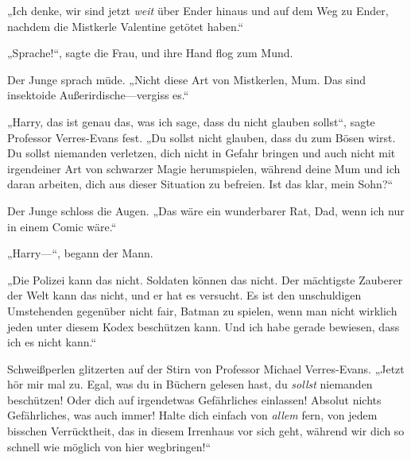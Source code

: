 „Ich denke, wir sind jetzt \emph{weit} über Ender hinaus und auf dem Weg zu Ender, nachdem die Mistkerle Valentine getötet haben.“

„Sprache!“, sagte die Frau, und ihre Hand flog zum Mund.

Der Junge sprach müde. „Nicht diese Art von Mistkerlen, Mum. Das sind insektoide Außerirdische—vergiss es.“

„Harry, das ist genau das, was ich sage, dass du nicht glauben sollst“, sagte Professor Verres-Evans fest. „Du sollst nicht glauben, dass du zum Bösen wirst. Du sollst niemanden verletzen, dich nicht in Gefahr bringen und auch nicht mit irgendeiner Art von schwarzer Magie herumspielen, während deine Mum und ich daran arbeiten, dich aus dieser Situation zu befreien. Ist das klar, mein Sohn?“

Der Junge schloss die Augen.
„Das wäre ein wunderbarer Rat, Dad, wenn ich nur in einem Comic wäre.“

„Harry—“, begann der Mann.

„Die Polizei kann das nicht. Soldaten können das nicht. Der mächtigste Zauberer der Welt kann das nicht, und er hat es versucht. Es ist den unschuldigen Umstehenden gegenüber nicht fair, Batman zu spielen, wenn man nicht wirklich jeden unter diesem Kodex beschützen kann. Und ich habe gerade bewiesen, dass ich es nicht kann.“

Schweißperlen glitzerten auf der Stirn von Professor Michael Verres-Evans.
„Jetzt hör mir mal zu. Egal, was du in Büchern gelesen hast, du \emph{sollst} niemanden beschützen! Oder dich auf irgendetwas Gefährliches einlassen! Absolut nichts Gefährliches, was auch immer! Halte dich einfach von \emph{allem} fern, von jedem bisschen Verrücktheit, das in diesem Irrenhaus vor sich geht, während wir dich so schnell wie möglich von hier wegbringen!“

